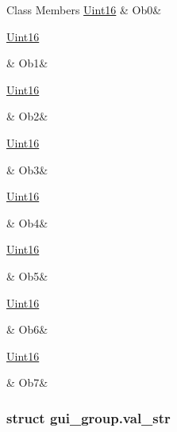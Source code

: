 \begin{DoxyFields}{Class Members}
\hypertarget{a00001_ad62b33c824adb5d87e757be30a450cb2}{\hyperlink{a00001_aae7407b021d43f7193a81a58cfb3e297}{Uint16}}\label{a00001_ad62b33c824adb5d87e757be30a450cb2}
&
Ob0&
\\
\hline

\hypertarget{a00001_a5421cb845bd48e0a97a8c8eb93605010}{\hyperlink{a00001_aae7407b021d43f7193a81a58cfb3e297}{Uint16}}\label{a00001_a5421cb845bd48e0a97a8c8eb93605010}
&
Ob1&
\\
\hline

\hypertarget{a00001_a9593c0978523e4e993eced3667101c7d}{\hyperlink{a00001_aae7407b021d43f7193a81a58cfb3e297}{Uint16}}\label{a00001_a9593c0978523e4e993eced3667101c7d}
&
Ob2&
\\
\hline

\hypertarget{a00001_a486f686536f75c60bbec950758e8c94c}{\hyperlink{a00001_aae7407b021d43f7193a81a58cfb3e297}{Uint16}}\label{a00001_a486f686536f75c60bbec950758e8c94c}
&
Ob3&
\\
\hline

\hypertarget{a00001_a5d2364f75ea43b4684e831c5b24c1f78}{\hyperlink{a00001_aae7407b021d43f7193a81a58cfb3e297}{Uint16}}\label{a00001_a5d2364f75ea43b4684e831c5b24c1f78}
&
Ob4&
\\
\hline

\hypertarget{a00001_ae9ac768c69a9201734c5261a1c6c1395}{\hyperlink{a00001_aae7407b021d43f7193a81a58cfb3e297}{Uint16}}\label{a00001_ae9ac768c69a9201734c5261a1c6c1395}
&
Ob5&
\\
\hline

\hypertarget{a00001_a191cff49179dce8cb6a0f3847062e6d1}{\hyperlink{a00001_aae7407b021d43f7193a81a58cfb3e297}{Uint16}}\label{a00001_a191cff49179dce8cb6a0f3847062e6d1}
&
Ob6&
\\
\hline

\hypertarget{a00001_a60d4d196fab75dfde3fb055f6e7b0056}{\hyperlink{a00001_aae7407b021d43f7193a81a58cfb3e297}{Uint16}}\label{a00001_a60d4d196fab75dfde3fb055f6e7b0056}
&
Ob7&
\\
\hline

\end{DoxyFields}
\label{d8/d53/a00081}
\hypertarget{a00001_d8/d53/a00081}{}
\subsubsection{struct gui\+\_\+group.\+val\+\_\+str}


